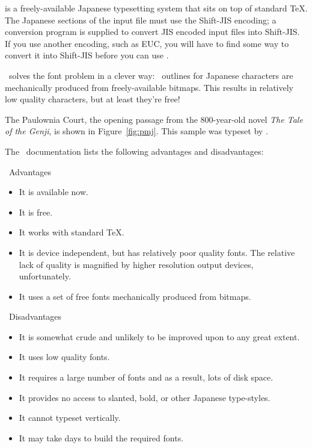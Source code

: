  is a freely-available Japanese typesetting system
that sits on top of standard \TeX.  The Japanese sections of the
input file must use the Shift-JIS encoding; a conversion program is supplied
to convert JIS encoded input files into Shift-JIS.  If you use another
encoding, such as EUC, you 
will have to find some way to convert it into
Shift-JIS before you can use \pmj.

\pmj\ solves the font problem in a clever way: \MF\ outlines for
Japanese characters are mechanically produced from freely-available
bitmaps.  This results in relatively low quality characters, but at
least they're free!

The Paulownia Court, the opening passage from the 800-year-old novel
\textit{The Tale of the Genji}, is shown in Figure~\ref{fig:pmj}.  This sample
was typeset by \pmj.


\newpage
The \pmj\ documentation lists the following advantages and disadvantages:

\pmj\ Advantages

\begin{itemize}
  \item It is available now.
  \item It is free.
  \item It works with standard \TeX.
  \item It is device independent, but has relatively poor quality fonts.  The
    relative lack of quality is magnified by higher resolution output devices,
    unfortunately.
  \item It uses a set of free fonts mechanically produced from bitmaps.
\end{itemize}

\pmj\ Disadvantages

\begin{itemize}
\item It is somewhat crude and unlikely to be improved upon to any great extent.
\item It uses low quality fonts.
\item It requires a large number of fonts and as a result, lots of disk space.
\item It provides no access to slanted, bold, or other Japanese type-styles.
\item It cannot typeset vertically. 
\item It may take days to build the required fonts.
\end{itemize}

